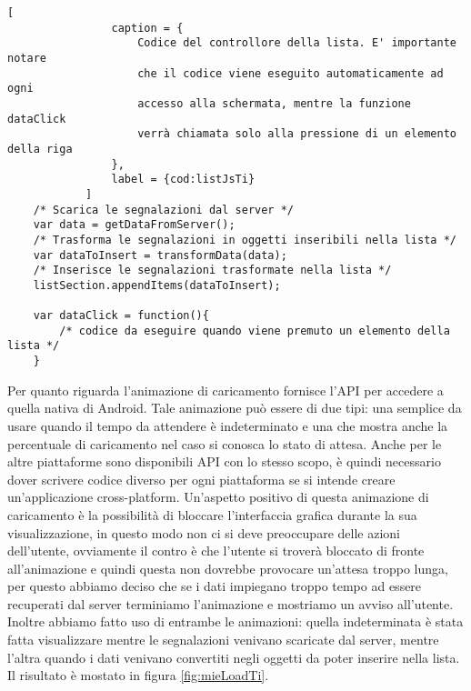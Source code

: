             \begin{lstlisting}[
                caption = {
                    Codice del controllore della lista. E' importante notare
                    che il codice viene eseguito automaticamente ad ogni
                    accesso alla schermata, mentre la funzione dataClick
                    verrà chiamata solo alla pressione di un elemento della riga
                },
                label = {cod:listJsTi}
            ]
    /* Scarica le segnalazioni dal server */
    var data = getDataFromServer();
    /* Trasforma le segnalazioni in oggetti inseribili nella lista */
    var dataToInsert = transformData(data);
    /* Inserisce le segnalazioni trasformate nella lista */
    listSection.appendItems(dataToInsert);

    var dataClick = function(){
        /* codice da eseguire quando viene premuto un elemento della lista */
    }
            \end{lstlisting}

            \noindent Per quanto riguarda l'animazione di caricamento \tisdk{} fornisce
            l'API per accedere a quella nativa di Android.
            Tale animazione può essere di due tipi: una semplice da usare quando
            il tempo da attendere è indeterminato e
            una che mostra anche la percentuale di caricamento nel caso si conosca
            lo stato di attesa.
            Anche per le altre piattaforme sono disponibili API con lo stesso scopo,
            è quindi necessario dover scrivere codice diverso per ogni piattaforma
            se si intende creare un'applicazione cross-platform.
            Un'aspetto positivo di questa animazione di caricamento è la possibilità
            di bloccare l'interfaccia grafica durante la sua visualizzazione,
            in questo modo non ci si deve preoccupare delle azioni dell'utente,
            ovviamente il contro è che l'utente si troverà bloccato di fronte
            all'animazione e quindi questa non dovrebbe provocare un'attesa troppo
            lunga, per questo abbiamo deciso che se i dati impiegano troppo tempo
            ad essere recuperati dal server terminiamo l'animazione e mostriamo
            un avviso all'utente. Inoltre abbiamo fatto uso di entrambe le animazioni:
            quella indeterminata è stata fatta visualizzare mentre le segnalazioni
            venivano scaricate dal server, mentre l'altra quando i dati venivano
            convertiti negli oggetti da poter inserire nella lista. Il risultato
            è mostato in figura \ref{fig:mieLoadTi}.

